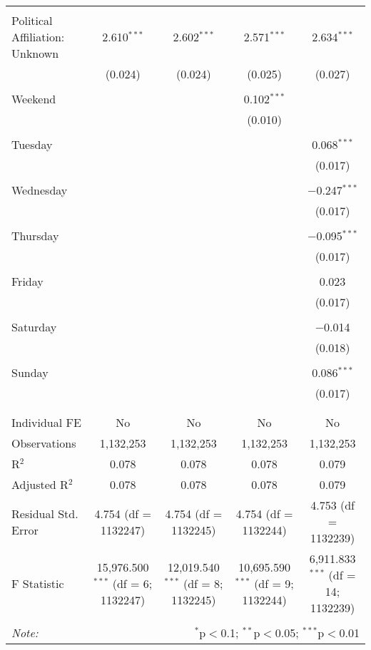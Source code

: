\documentclass[
]{article}
\begin{document}
\begin{table}[!htbp]
{\begin{tabular}{@{\extracolsep{5pt}}lcccc}
  & & & & \\ 
 Political Affiliation: Unknown & 2.610$^{***}$ & 2.602$^{***}$ & 2.571$^{***}$ & 2.634$^{***}$ \\ 
  & (0.024) & (0.024) & (0.025) & (0.027) \\ 
  & & & & \\ 
 Weekend &  &  & 0.102$^{***}$ &  \\ 
  &  &  & (0.010) &  \\ 
  & & & & \\ 
 Tuesday &  &  &  & 0.068$^{***}$ \\ 
  &  &  &  & (0.017) \\ 
  & & & & \\ 
 Wednesday &  &  &  & $-$0.247$^{***}$ \\ 
  &  &  &  & (0.017) \\ 
  & & & & \\ 
 Thursday &  &  &  & $-$0.095$^{***}$ \\ 
  &  &  &  & (0.017) \\ 
  & & & & \\ 
 Friday &  &  &  & 0.023 \\ 
  &  &  &  & (0.017) \\ 
  & & & & \\ 
 Saturday &  &  &  & $-$0.014 \\ 
  &  &  &  & (0.018) \\ 
  & & & & \\ 
 Sunday &  &  &  & 0.086$^{***}$ \\ 
  &  &  &  & (0.017) \\ 
  & & & & \\ 
\hline \\[-1.8ex] 
Individual FE & No & No & No & No \\ 
Observations & 1,132,253 & 1,132,253 & 1,132,253 & 1,132,253 \\ 
R$^{2}$ & 0.078 & 0.078 & 0.078 & 0.079 \\ 
Adjusted R$^{2}$ & 0.078 & 0.078 & 0.078 & 0.079 \\ 
Residual Std. Error & 4.754 (df = 1132247) & 4.754 (df = 1132245) & 4.754 (df = 1132244) & 4.753 (df = 1132239) \\ 
F Statistic & 15,976.500$^{***}$ (df = 6; 1132247) & 12,019.540$^{***}$ (df = 8; 1132245) & 10,695.590$^{***}$ (df = 9; 1132244) & 6,911.833$^{***}$ (df = 14; 1132239) \\ 
\hline 
\hline \\[-1.8ex] 
\textit{Note:}  & \multicolumn{4}{r}{$^{*}$p$<$0.1; $^{**}$p$<$0.05; $^{***}$p$<$0.01} \\ 
\end{tabular}
} 
\end{table} 
\newpage
\end{document}
